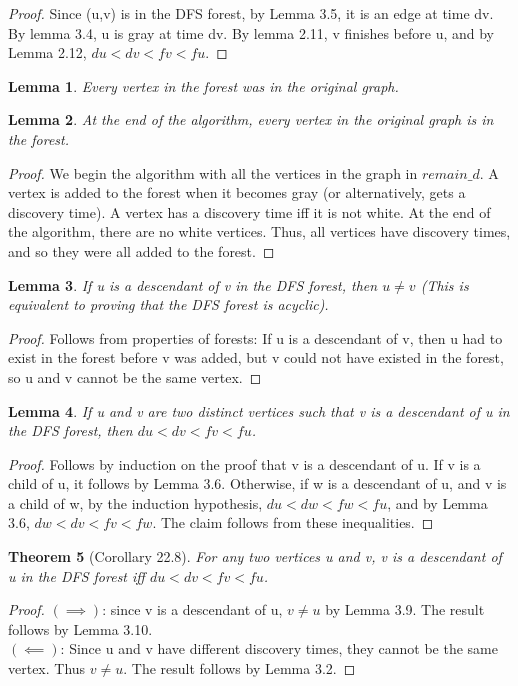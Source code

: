 \documentclass{article}
\newtheorem{theorem}{Theorem}[section]
\newtheorem{lemma}[theorem]{Lemma}
\begin{document}
\begin{proof}
Since (u,v) is in the DFS forest, by Lemma 3.5, it is an edge at time dv. By lemma 3.4, u is gray at time dv. By lemma 2.11, v finishes before u, and by Lemma 2.12, $du < dv < fv < fu$.
\end{proof}
\begin{lemma}
Every vertex in the forest was in the original graph.
\end{lemma}
\begin{lemma}
At the end of the algorithm, every vertex in the original graph is in the forest.
\end{lemma}
\begin{proof}
We begin the algorithm with all the vertices in the graph in $remain\_d$. A vertex is added to the forest when it becomes gray (or alternatively, gets a discovery time). A vertex has a discovery time iff it is not white. At the end of the algorithm, there are no white vertices. Thus, all vertices have discovery times, and so they were all added to the forest.
\end{proof}
\begin{lemma}
If u is a descendant of v in the DFS forest, then $u \neq v$ (This is equivalent to proving that the DFS forest is acyclic).
\end{lemma}
\begin{proof}
Follows from properties of forests: If u is a descendant of v, then u had to exist in the forest before v was added, but v could not have existed in the forest, so u and v cannot be the same vertex.
\end{proof}
\begin{lemma}
If u and v are two distinct vertices such that v is a descendant of u in the DFS forest, then $du < dv < fv < fu$.
\end{lemma}
\begin{proof}
Follows by induction on the proof that v is a descendant of u. If v is a child of u, it follows by Lemma 3.6. Otherwise, if w is a descendant of u, and v is a child of w, by the induction hypothesis, $du < dw < fw < fu$, and by Lemma 3.6, $dw < dv < fv < fw$. The claim follows from these inequalities.
\end{proof}
\begin{theorem}[Corollary 22.8]
For any two vertices u and v, v is a descendant of u in the DFS forest iff $du < dv < fv < fu$.
\end{theorem}
\begin{proof}
$(\implies)$: since v is a descendant of u, $v\neq u$ by Lemma 3.9. The result follows by Lemma 3.10.
\\$(\impliedby)$: Since u and v have different discovery times, they cannot be the same vertex. Thus $v\neq u$. The result follows by Lemma 3.2.
\end{proof}
\end{document}
